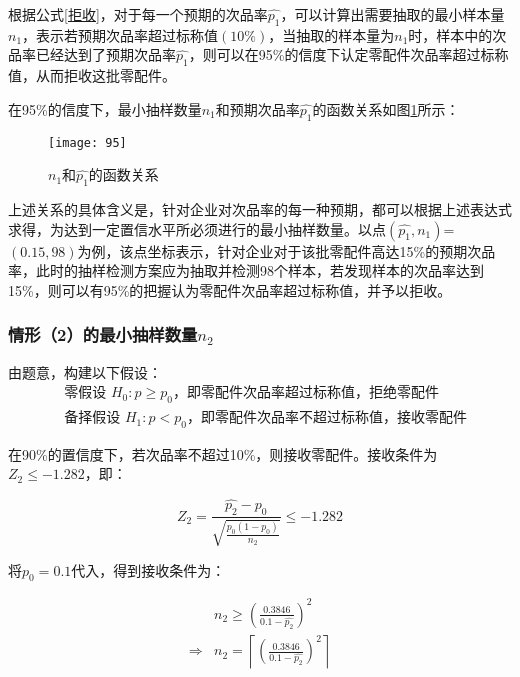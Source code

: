 \documentclass[withoutpreface,bwprint]{cumcmthesis} %
\begin{document}
根据公式\ref{拒收}，对于每一个预期的次品率$\hat{p_1}$，可以计算出需要抽取的最小样本量$n_1$，表示若预期次品率超过标称值$(10\%)$，当抽取的样本量为$n_1$时，样本中的次品率已经达到了预期次品率$\hat{p_1}$，则可以在95\%的信度下认定零配件次品率超过标称值，从而拒收这批零配件。

在95\%的信度下，最小抽样数量$n_1$和预期次品率$\hat{p_1}$的函数关系如图\ref{pic.1}所示：

\begin{figure}[htbp]  %
	\centering  %
	\texttt{[image: 95]} %
	\caption{$n_1$和$\hat{p_1}$的函数关系}  
	\label{pic.1}
\end{figure}

上述关系的具体含义是，针对企业对次品率的每一种预期，都可以根据上述表达式求得，为达到一定置信水平所必须进行的最小抽样数量。以点$(\hat{p_1},n_1)$=$(0.15,98)$为例，该点坐标表示，针对企业对于该批零配件高达15\%的预期次品率，此时的抽样检测方案应为抽取并检测98个样本，若发现样本的次品率达到15\%，则可以有95\%的把握认为零配件次品率超过标称值，并予以拒收。


\subsubsection{情形（2）的最小抽样数量$n_2$}

由题意，构建以下假设：
\begin{align*}
	&\text{零假设 }H_0: p \geq p_0\text{，即零配件次品率超过标称值，拒绝零配件} \\
	&\text{备择假设 }H_1: p < p_0\text{，即零配件次品率不超过标称值，接收零配件}
\end{align*}

在90\%的置信度下，若次品率不超过10\%，则接收零配件。接收条件为$Z_2\leqslant -1.282$，即：

\begin{equation}
	Z_2 = \frac{\hat{p_2}-p_0}{\sqrt{\frac{p_0\left(1-p_0\right)}{n_2}}} \leqslant -1.282
\end{equation}

将$p_0=0.1$代入，得到接收条件为：

%
\begin{equation}
	\begin{aligned}
		& n_2 \geqslant\left(\frac{0.3846}{0.1-\hat{p_2}}\right)^2 \\
		\Rightarrow & n_2=\left\lceil\left(\frac{0.3846}{0.1-\hat{p_2}}\right)^2\right\rceil
	\end{aligned}
		\label{接收}
\end{equation}
\end{document}
